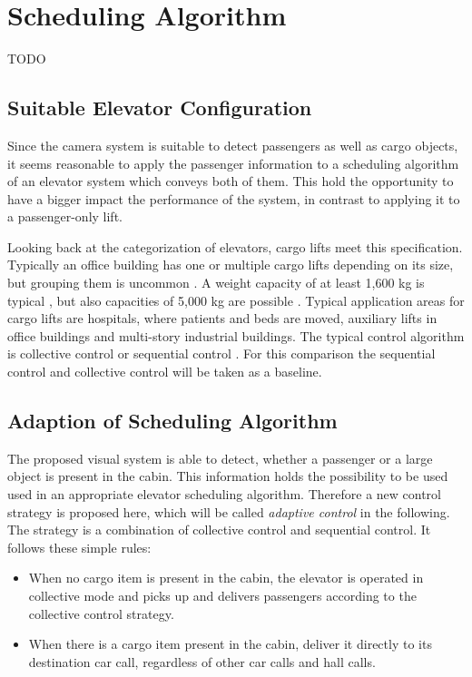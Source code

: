 \section{Scheduling Algorithm}
TODO
\subsection{Suitable Elevator Configuration}
Since the camera system is suitable to detect passengers as well as cargo objects,
it seems reasonable to apply the passenger information 
to a scheduling algorithm of an elevator system which conveys both of them.
This hold the opportunity to have a bigger impact the performance of the system, 
in contrast to applying it to a passenger-only lift.

Looking back at the categorization of elevators, cargo lifts meet this specification.
Typically an office building has one or multiple cargo lifts depending on its size,
but grouping them is uncommon \autocite[][p.~167]{barney2016handbook}.
A weight capacity of at least 1,600 kg is typical \autocite[][p.~167]{barney2016handbook},
but also capacities of 5,000 kg are possible \autocite[][]{kone2017overview}.
Typical application areas for cargo lifts are hospitals, where patients and beds are moved,
auxiliary lifts in office buildings and multi-story industrial buildings.
The typical control algorithm is collective control or sequential control \autocite[][pp.~238,~244]{barney2016handbook}.
For this comparison the sequential control and collective control will be taken as a baseline.

\subsection{Adaption of Scheduling Algorithm}
The proposed visual system is able to detect, whether a passenger or a large object is present in the cabin.
This information holds the possibility to be used used in an appropriate elevator scheduling algorithm.
Therefore a new control strategy is proposed here, which will be called \emph{adaptive control} in the following. 
The strategy is a combination of collective control and sequential control.
It follows these simple rules:

\begin{itemize}
    \item When no cargo item is present in the cabin, the elevator is operated in collective mode and picks up and delivers passengers according to the collective control strategy.
    \item When there is a cargo item present in the cabin, deliver it directly to its destination car call, regardless of other car calls and hall calls.
\end{itemize}

